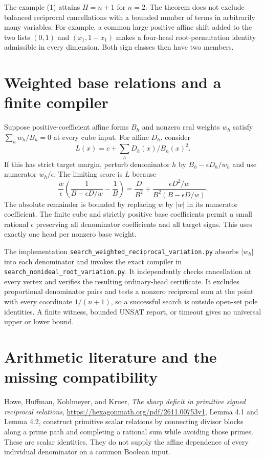 \documentclass[11pt]{article}
\begin{document}
The example (1) attains $H=n+1$ for $n=2$. The theorem does not
exclude balanced reciprocal cancellations with a bounded number of
terms in arbitrarily many variables. For example, a common large
positive affine shift added to the two lists $(0,1)$ and
$(x_1,1-x_1)$ makes a four-head root-permutation identity admissible
in every dimension. Both sign classes then have two members.

\section{Weighted base relations and a finite compiler}

Suppose positive-coefficient affine forms $B_h$ and nonzero real
weights $w_h$ satisfy $\sum_h w_h/B_h=0$ at every cube input.
For affine $D_h$, consider
\[
                  L(x)=c+\sum_h D_h(x)/B_h(x)^2.
\]
If this has strict target margin, perturb denominator $h$ by
$B_h-\epsilon D_h/w_h$ and use numerator $w_h/\epsilon$.
The limiting score is $L$ because
\[
 \frac{w}{\epsilon}\left(\frac1{B-\epsilon D/w}-\frac1B\right)
 =\frac{D}{B^2}+\frac{\epsilon D^2/w}{B^2(B-\epsilon D/w)}.
\]
The absolute remainder is bounded by replacing $w$ by $|w|$ in
its numerator coefficient. The finite cube and strictly positive
base coefficients permit a small rational $\epsilon$ preserving
all denominator coefficients and all target signs. This uses exactly
one head per nonzero base weight.

The implementation \texttt{search\_weighted\_reciprocal\_variation.py}
absorbs $|w_h|$ into each denominator and invokes the exact compiler
in \texttt{search\_nonideal\_root\_variation.py}. It independently
checks cancellation at every vertex and verifies the resulting
ordinary-head certificate. It excludes proportional denominator pairs
and tests a nonzero reciprocal sum at the point with every coordinate
$1/(n+1)$, so a successful search is outside open-set pole identities.
A finite witness, bounded UNSAT report, or timeout gives no universal
upper or lower bound.

\section{Arithmetic literature and the missing compatibility}

Howe, Huffman, Kohlmeyer, and Kruer,
\emph{The sharp deficit in primitive signed reciprocal relations},
\url{https://hexagonmath.org/pdf/2611.00753v1},
Lemma 4.1 and Lemma 4.2, construct primitive scalar relations by
connecting divisor blocks along a prime path and completing a
rational sum while avoiding those primes. These are scalar
identities. They do not supply the affine dependence of every
individual denominator on a common Boolean input.
\end{document}
